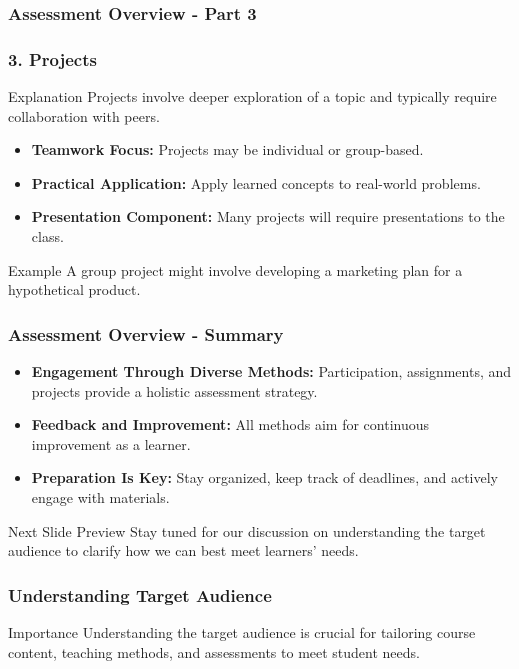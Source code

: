 \documentclass[aspectratio=169]{beamer}
\begin{document}
\begin{frame}[fragile]
    \frametitle{Assessment Overview - Part 3}
    \frametitle{3. Projects}

    \begin{block}{Explanation}
        Projects involve deeper exploration of a topic and typically require collaboration with peers.
    \end{block}

    \begin{itemize}
        \item \textbf{Teamwork Focus:} Projects may be individual or group-based.
        \item \textbf{Practical Application:} Apply learned concepts to real-world problems.
        \item \textbf{Presentation Component:} Many projects will require presentations to the class.
    \end{itemize}

    \begin{block}{Example}
        A group project might involve developing a marketing plan for a hypothetical product.
    \end{block}
\end{frame}

\begin{frame}[fragile]
    \frametitle{Assessment Overview - Summary}
    \begin{itemize}
        \item \textbf{Engagement Through Diverse Methods:} Participation, assignments, and projects provide a holistic assessment strategy.
        \item \textbf{Feedback and Improvement:} All methods aim for continuous improvement as a learner.
        \item \textbf{Preparation Is Key:} Stay organized, keep track of deadlines, and actively engage with materials.
    \end{itemize}

    \begin{block}{Next Slide Preview}
        Stay tuned for our discussion on understanding the target audience to clarify how we can best meet learners' needs.
    \end{block}
\end{frame}

\begin{frame}[fragile]
  \frametitle{Understanding Target Audience}
  \begin{block}{Importance}
    Understanding the target audience is crucial for tailoring course content, teaching methods, and assessments to meet student needs.
  \end{block}
\end{frame}
\end{document}
